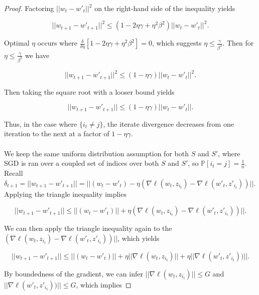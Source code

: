 \documentclass[10pt,a4paper]{amsart}
\begin{document}
\begin{proof}
\noindent
Factoring $||w_{t} - w'_{t}||^2$ on the right-hand side of the inequality yields

\begin{equation}
||w_{t+1} - w'_{t+1}||^2 \leq (1-2\eta\gamma+\eta^2\beta^2)||w_{t} - w'_{t}||^2.
\end{equation}

\noindent
Optimal $\eta$ occurs where $\frac{\delta}{\delta \eta}[1-2\eta\gamma+\eta^2\beta^2]=0$, which suggests $\eta \leq \frac{\gamma}{\beta^2}$. Then for $\eta \leq \frac{\gamma}{\beta^2}$ we have 

\begin{equation}
||w_{t+1} - w'_{t+1}||^2 \leq (1-\eta\gamma)||w_{t} - w'_{t}||^2.
\end{equation}

\noindent
Then taking the square root with a looser bound yields

\begin{equation}
||w_{t+1} - w'_{t+1}|| \leq (1-\eta\gamma)||w_{t} - w'_{t}||.
\end{equation}

\noindent
Thus, in the case where $\{i_t \neq j\}$, the iterate divergence decreases from one iteration to the next at a factor of $1 - \eta\gamma$. \\
\\
 We keep the same uniform distribution assumption for both $S$ and $S'$, where SGD is ran over a coupled set of indices over both $S$ and $S'$, so $\mathbb{P}[i_t = j] = \frac{1}{n}$. Recall $\delta_{t+1} = ||w_{t+1} - w'_{t+1}|| = ||(w_t - w'_t) - \eta(\nabla \ell(w_t, z_{i_t}) - \nabla \ell(w'_t, z'_{i_t}))||$. Applying the triangle inequality implies

\begin{equation}
||w_{t+1} - w'_{t+1}|| \leq ||(w_t - w'_t)|| +  \eta(\nabla \ell(w_t, z_{i_t}) - \nabla \ell(w'_t, z'_{i_t}))||.
\end{equation}

\noindent
We can then apply the triangle inequality again to the $(\nabla \ell(w_t, z_{i_t}) - \nabla \ell(w'_t, z'_{i_t}))||$, which yields

\begin{equation}
||w_{t+1} - w'_{t+1}|| \leq ||(w_t - w'_t)|| +  \eta||\nabla \ell(w_t, z_{i_t})|| + \eta ||\nabla \ell(w'_t, z'_{i_t}))||.  
\end{equation}

\noindent
By boundedness of the gradient, we can infer $||\nabla \ell(w_t, z_{i_t})|| \leq G$ and $||\nabla \ell(w'_t, z'_{i_t}))|| \leq G$, which implies


\end{proof}
\end{document}
